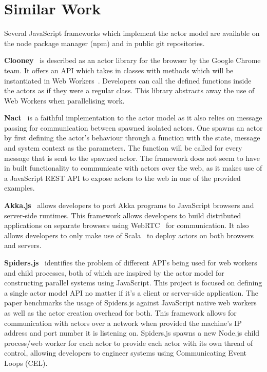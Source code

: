 \documentclass[oneside]{um-fict}
\begin{document}
\section{Similar Work}
Several JavaScript frameworks which implement the actor model are available on the node package manager (npm) and in public git repositories.

\textbf{Clooney}~\cite{clooney} is described as an actor library for the browser by the Google Chrome team. It offers an API which takes in classes with methods which will be instantiated in Web Workers~\cite{webworkers}. Developers can call the defined functions inside the actors as if they were a regular class. This library abstracts away the use of Web Workers when parallelising work.

\textbf{Nact}~\cite{nact} is a faithful implementation to the actor model as it also relies on message passing for communication between spawned isolated actors. One spawns an actor by first defining the actor's behaviour through a function with the state, message and system context as the parameters. The function will be called for every message that is sent to the spawned actor. The framework does not seem to have in built functionality to communicate with actors over the web, as it makes use of a JavaScript REST API to expose actors to the web in one of the provided examples.

\textbf{Akka.js}~\cite{stivan2015akka} allows developers to port Akka programs to JavaScript browsers and server-side runtimes. This framework allows developers to build distributed applications on separate browsers using WebRTC~\cite{webrtc} for communication. It also allows developers to only make use of Scala~\cite{scala} to deploy actors on both browsers and servers.

\textbf{Spiders.js}~\cite{spidersjs} identifies the problem of different API's being used for web workers and child processes, both of which are inspired by the actor model for constructing parallel systems using JavaScript. This project is focused on defining a single actor model API no matter if it's a client or server-side application. The paper benchmarks the usage of Spiders.js against JavaScript native web workers as well as the actor creation overhead for both. This framework allows for communication with actors over a network when provided the machine's IP address and port number it is listening on. Spiders.js spawns a new Node.js child process/web worker for each actor to provide each actor with its own thread of control, allowing developers to engineer systems using Communicating Event Loops (CEL).
\end{document}
